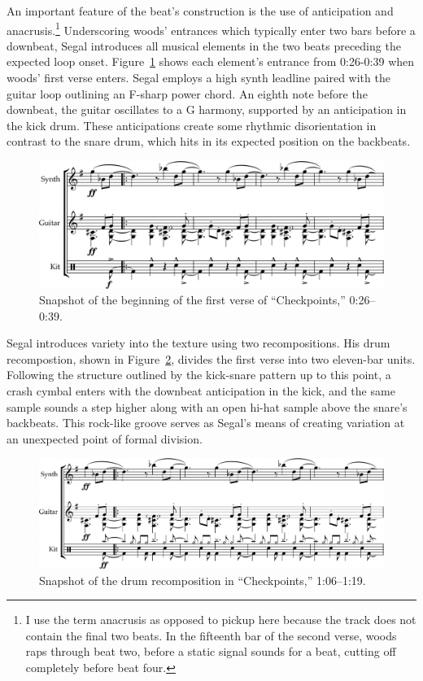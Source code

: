 An important feature of the beat's construction is the use of anticipation and anacrusis.\footnote{
    I use the term anacrusis as opposed to pickup here because the track does not contain
    the final two beats. In the fifteenth bar of the second verse, woods raps through beat two,
    before  a static signal sounds for a beat, cutting off completely before beat four.} 
Underscoring woods' entrances which typically enter two bars before a downbeat, Segal introduces all
musical elements in the two beats preceding the expected loop onset. Figure~\ref{fig:checkpointsintro} 
shows each element's entrance from 0:26-0:39 when woods' first verse enters. Segal employs a high synth
leadline paired with the guitar loop outlining an F-sharp power chord. An eighth note before the downbeat,
the guitar oscillates to a G harmony, supported by an anticipation in the kick drum. These anticipations
create some rhythmic disorientation in contrast to the snare drum, which hits in its expected position
on the backbeats.

    \begin{figure}[ht]
        \centering
        \includegraphics[width=\textwidth]{images/figures/chp 02/026039checkpointsintro.pdf}
        \caption{Snapshot of the beginning of the first verse of ``Checkpoints,'' 0:26--0:39.}
        \label{fig:checkpointsintro}
    \end{figure}

Segal introduces variety into the texture using two recompositions. His drum recompostion, shown 
in Figure~\ref{fig:checkpointsmain}, divides the first verse  into two eleven-bar units. Following
the structure outlined by the kick-snare pattern up to this point, a crash cymbal enters with the 
downbeat anticipation in the kick, and the same sample sounds a step  higher along with an open 
hi-hat sample above the snare's backbeats. This rock-like groove serves as Segal's means of creating
variation at an unexpected point of formal division.

    \begin{figure}[ht]
        \centering
        \includegraphics[width=\textwidth]{images/figures/chp 02/106119checkpointsmain.pdf}
        \caption{Snapshot of the drum recomposition in ``Checkpoints,'' 1:06--1:19.}
        \label{fig:checkpointsmain}
    \end{figure}

